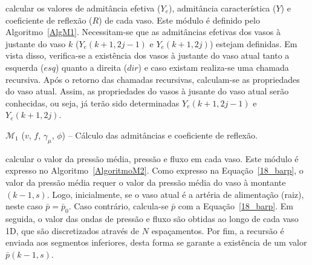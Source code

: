  calcular os valores de admitância efetiva ($Y_e$), admitância característica ($Y$) e coeficiente de reflexão ($R$) de cada vaso. Este módulo é definido pelo Algoritmo~\ref{AlgM1}. Necessitam-se que as admitâncias efetivas dos vasos à justante do vaso $k$ ($Y_e(k+1,2j-1)$ e $Y_e(k+1,2j)$) estejam definidas. Em vista disso, verifica-se a existência dos vasos à justante do vaso atual tanto a esquerda ($esq$) quanto a direita ($dir$) e caso existam realiza-se uma chamada recursiva. Após o retorno das chamadas recursivas, calculam-se as propriedades do vaso atual. Assim, as propriedades do vasos à jusante do vaso atual serão conhecidas, ou seja, já terão sido determinadas $Y_e(k+1,2j-1)$ e $Y_e(k+1,2j)$.

\begin{algorithm}[H]
	\caption{$\mathcal{M}_1$ ($v$, $f$, $\gamma_{\mu}$, $\phi$) -- Cálculo das admitâncias e coeficiente de reflexão.}
	\label{AlgM1}
\end{algorithm}

 calcular o valor da pressão média, pressão e fluxo em cada vaso. Este módulo é expresso no Algoritmo~\ref{AlgoritmoM2}. Como expresso na Equação~\eqref{18_barp}, o valor da pressão média requer o valor da pressão média do vaso à montante $(k-1,s)$. Logo, inicialmente, se o vaso atual é a artéria de alimentação (raiz), neste caso $\bar{p} = \bar{p}_0$. Caso contrário, calcula-se $\bar{p}$ com a Equação~\eqref{18_barp}. Em seguida, o valor das ondas de pressão e fluxo são obtidas ao longo de cada vaso 1D, que são discretizados através de $N$ espaçamentos. Por fim, a recursão é enviada aos segmentos inferiores, desta forma se garante a existência de um valor $\bar{p}(k-1,s)$.

